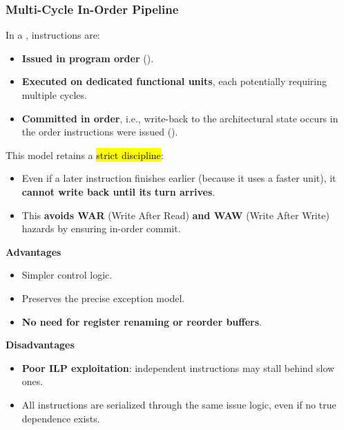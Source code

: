 \subsubsection{Multi-Cycle In-Order Pipeline}\label{subsubsection: Multi-Cycle In-Order Pipeline}

In a , instructions are:
\begin{itemize}
    \item \textbf{Issued in program order} (). 
    \item \textbf{Executed on dedicated functional units}, each potentially requiring multiple cycles.  
    \item \textbf{Committed in order}, i.e., write-back to the architectural state occurs in the order instructions were issued ().
\end{itemize}
This model retains a \hl{strict discipline}:
\begin{itemize}
    \item Even if a later instruction finishes earlier (because it uses a faster unit), it \textbf{cannot write back until its turn arrives}.
    \item This \textbf{avoids WAR} (Write After Read) \textbf{and WAW} (Write After Write) hazards by ensuring in-order commit.
\end{itemize}

\highspace
\begin{flushleft}
    \textcolor{Green3}{ \textbf{Advantages}}
\end{flushleft}
\begin{itemize}[label=\textcolor{Green3}{}]
    \item Simpler control logic.
    \item Preserves the precise exception model.
    \item \textbf{No need for register renaming or reorder buffers}.
\end{itemize}

\highspace
\begin{flushleft}
    \textcolor{Red2}{ \textbf{Disadvantages}}
\end{flushleft}
\begin{itemize}[label=\textcolor{Red2}{}]
    \item \textbf{Poor ILP exploitation}: independent instructions may stall behind slow ones.
    \item All instructions are serialized through the same issue logic, even if no true dependence exists.
\end{itemize}

